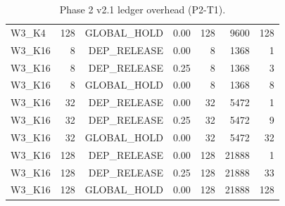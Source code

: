 \begin{table}[t]
\begin{tabular}{lrrrrrr}
W3\_K4 & 128 & GLOBAL\_HOLD & 0.00 & 128 & 9600 & 128 \\
W3\_K16 & 8 & DEP\_RELEASE & 0.00 & 8 & 1368 & 1 \\
W3\_K16 & 8 & DEP\_RELEASE & 0.25 & 8 & 1368 & 3 \\
W3\_K16 & 8 & GLOBAL\_HOLD & 0.00 & 8 & 1368 & 8 \\
W3\_K16 & 32 & DEP\_RELEASE & 0.00 & 32 & 5472 & 1 \\
W3\_K16 & 32 & DEP\_RELEASE & 0.25 & 32 & 5472 & 9 \\
W3\_K16 & 32 & GLOBAL\_HOLD & 0.00 & 32 & 5472 & 32 \\
W3\_K16 & 128 & DEP\_RELEASE & 0.00 & 128 & 21888 & 1 \\
W3\_K16 & 128 & DEP\_RELEASE & 0.25 & 128 & 21888 & 33 \\
W3\_K16 & 128 & GLOBAL\_HOLD & 0.00 & 128 & 21888 & 128 \\
\bottomrule
\end{tabular}
\caption{Phase 2 v2.1 ledger overhead (P2-T1).}
\end{table}
